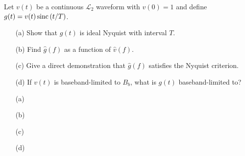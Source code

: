 \documentclass{assignment}
\begin{document}
\begin{prob}[6.5, Nyquist]
    Let $v(t)$ be a continuous $\mathcal{L}_2$ waveform with $v(0)=1$ and define $g(t)=v(t)\,\text{sinc}\,(t/T)$.
    \begin{itemize}
        \item[(a)] Show that $g(t)$ is ideal Nyquist with interval $T$.
        \item[(b)] Find $\hat{g}(f)$ as a function of $\hat{v}(f)$.
        \item[(c)] Give a direct demonstration that $\hat{g}(f)$ satisfies the Nyquist criterion.
        \item[(d)] If $v(t)$ is baseband-limited to $B_b$, what is $g(t)$ baseband-limited to?
    \end{itemize}
\end{prob}
\begin{sol}
    \begin{itemize}
        \item[(a)] 
        \item[(b)] 
        \item[(c)] 
        \item[(d)] 
    \end{itemize}
\end{sol}
\end{document}
